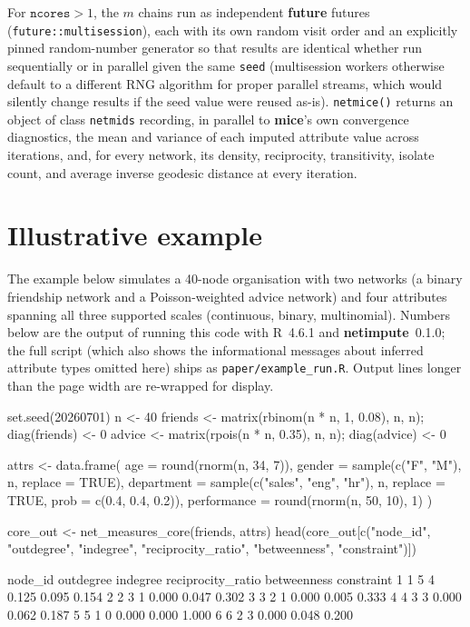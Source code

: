 \documentclass[11pt,a4paper]{article}
\newcommand{\pkg}[1]{\textbf{#1}}
\newcommand{\code}[1]{\texttt{#1}}
\newcommand{\proglang}[1]{\textsf{#1}}
\begin{document}
For $\code{ncores} > 1$, the $m$ chains run as independent \pkg{future}
futures (\code{future::multisession}), each with its own random visit order
and an explicitly pinned random-number generator so that results are
identical whether run sequentially or in parallel given the same
\code{seed} (multisession workers otherwise default to a different RNG
algorithm for proper parallel streams, which would silently change results
if the seed value were reused as-is). \code{netmice()} returns an object of
class \code{netmids} recording, in parallel to \pkg{mice}'s own convergence
diagnostics, the mean and variance of each imputed attribute
value across iterations, and, for every network, its density, reciprocity,
transitivity, isolate count, and average inverse geodesic distance at every
iteration.

\section{Illustrative example}
\label{sec:example}

The example below simulates a 40-node organisation with two networks (a
binary friendship network and a Poisson-weighted advice network) and four
attributes spanning all three supported scales (continuous, binary,
multinomial). Numbers below are the output of running this code with
\proglang{R}~4.6.1 and \pkg{netimpute}~0.1.0; the full script (which also
shows the informational messages about inferred attribute types omitted
here) ships as \code{paper/example\_run.R}. Output lines longer than the
page width are re-wrapped for display.

\begin{Rinput}
set.seed(20260701)
n <- 40
friends <- matrix(rbinom(n * n, 1, 0.08), n, n); diag(friends) <- 0
advice  <- matrix(rpois(n * n, 0.35), n, n);     diag(advice)  <- 0

attrs <- data.frame(
  age         = round(rnorm(n, 34, 7)),
  gender      = sample(c("F", "M"), n, replace = TRUE),
  department  = sample(c("sales", "eng", "hr"), n, replace = TRUE,
                        prob = c(0.4, 0.4, 0.2)),
  performance = round(rnorm(n, 50, 10), 1)
)

core_out <- net_measures_core(friends, attrs)
head(core_out[c("node_id", "outdegree", "indegree",
                "reciprocity_ratio", "betweenness", "constraint")])
\end{Rinput}

\begin{Routput}
  node_id outdegree indegree reciprocity_ratio betweenness constraint
1       1         5        4             0.125       0.095      0.154
2       2         3        1             0.000       0.047      0.302
3       3         2        1             0.000       0.005      0.333
4       4         3        3             0.000       0.062      0.187
5       5         1        0             0.000       0.000      1.000
6       6         2        3             0.000       0.048      0.200
\end{Routput}
\end{document}
